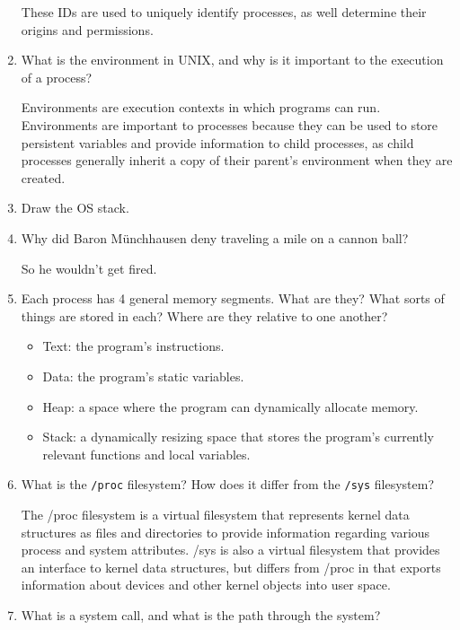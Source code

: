 \documentclass[letterpaper,10pt,onecolumn,titlepage]{article}
\begin{document}
\begin{enumerate}[itemsep=0.1 in]
  These IDs are used to uniquely identify processes, as well determine their origins and permissions.

\item What is the environment in UNIX, and why is it important to the execution of a
  process?

  Environments are execution contexts in which programs can run. Environments are important to processes because they can be used to store persistent variables and provide information to child processes, as child processes generally inherit a copy of their parent's environment when they are created.

\item Draw the OS stack.



\item Why did Baron M\"unchhausen deny traveling a mile on a cannon ball? 

So he wouldn't get fired.

\item Each process has 4 general memory segments. What are they? What sorts of things are
  stored in each? Where are they relative to one another?

  \begin{itemize}
    \item Text: the program's instructions.
    \item Data: the program's static variables.
    \item Heap: a space where the program can dynamically allocate memory.
    \item Stack: a dynamically resizing space that stores the program's currently relevant functions and local variables.
  \end{itemize}



\item What is the \texttt{/proc} filesystem? How does it differ from the \texttt{/sys}
  filesystem?

  The /proc filesystem is a virtual filesystem that represents kernel data structures as files and directories to provide information regarding various process and system attributes.  /sys is also a virtual filesystem that provides an interface to kernel data structures, but differs from /proc in that exports information about devices and other kernel objects into user space.

\item What is a system call, and what is the path through the system?


\end{enumerate}
\end{document}
